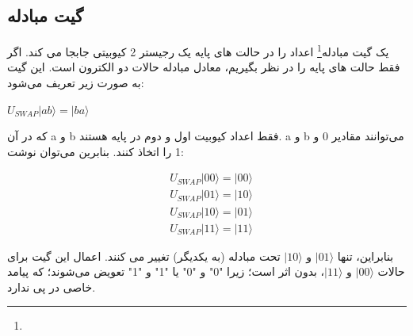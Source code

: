 \documentclass{book}
\begin{document}
 
 
\subsection{گیت مبادله}
یک گیت مبادله\footnote{} اعداد را در حالت های پایه یک رجیستر 2 کیوبیتی جابجا می کند. اگر فقط حالت های پایه را در نظر بگیریم، معادل مبادله حالات دو الکترون است. این گیت به صورت  زیر تعریف می‌شود:
\begin{center}
	$U_{SWAP}   \vert ab\rangle = \vert ba \rangle$
\end{center}
که در آن a و b فقط اعداد کیوبیت اول و دوم در پایه هستند. a و b می‌توانند مقادیر 0 و 1 را اتخاذ کنند. بنابرین می‌توان نوشت:
\begin{center}
	$$\begin{aligned}
		& U_{S W A P}|00\rangle=|00\rangle \\
		& U_{S W A P}|01\rangle=|10\rangle \\
		& U_{S W A P}|10\rangle=|01\rangle \\
		& U_{S W A P}|11\rangle=|11\rangle
	\end{aligned}$$
\end{center}




بنابراین، تنها $\vert 01 \rangle$ و $\vert 10 \rangle$ تحت مبادله (به یکدیگر) تغییر می کنند.
اعمال این گیت برای حالات $\vert 00 \rangle$ و $\vert 11 \rangle$، بدون اثر است؛ زیرا "0" و "0" یا "1" و "1" تعویض می‌شوند؛ که پیامد خاصی در پی ندارد.
\end{document}
